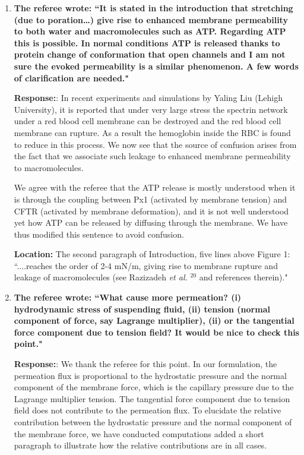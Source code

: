 \documentclass[12pt]{article}
\begin{document}
\begin{enumerate}
\item {\bf 
The referee wrote:
``It is stated in the introduction that stretching (due to poration…)
give rise to enhanced membrane permeability to both water and
macromolecules such as ATP. Regarding ATP this is possible. In normal
conditions ATP is released thanks to protein change of conformation
that open channels and I am not sure the evoked permeability is a
similar phenomenon. A few words of clarification are needed."}

\noindent
{\bf Response:}: In recent experiments and simulations by Yaling Liu (Lehigh University), it is reported that under very large stress the spectrin network under a red blood cell membrane can be destroyed and the red blood cell membrane can rupture. As a result the hemoglobin inside the RBC is found to reduce in this process. We now see that the source of confusion arises from the fact that we associate such leakage to enhanced membrane permeability to macromolecules. 

We agree with the referee that the ATP release is mostly understood when it is through the coupling between Px1 (activated by membrane tension) and CFTR (activated by membrane deformation), and it is not well understood yet how ATP can be released by diffusing through the membrane. We have thus modified this sentence to avoid confusion.

\noindent
{\bf Location:}  The second paragraph of Introduction, five lines above Figure 1: ``....reaches the order of 2-4 mN/m, giving rise to
membrane rupture and leakage of macromolecules (see Razizadeh {\it et al. }$^{20}$ and references therein)."

\item {\bf
The referee wrote:
``What cause more permeation? (i) hydrodynamic stress of suspending
fluid, (ii) tension (normal component of force, say Lagrange
multiplier), (ii) or the tangential force component due to tension
field? It would be nice to check this point."}

\noindent
{\bf Response:}: We thank the referee for this point. In our formulation, the permeation flux is proportional to the hydrostatic pressure and the normal component of the membrane force, which is the capillary pressure due to the Lagrange multiplier tension. The tangential force component due to tension field does not contribute to the permeation flux. To elucidate the relative contribution between the hydrostatic pressure and the normal component of the membrane force, we have conducted computations 
added a short paragraph to illustrate how the relative contributions are in all cases.


\end{enumerate}
\end{document}
